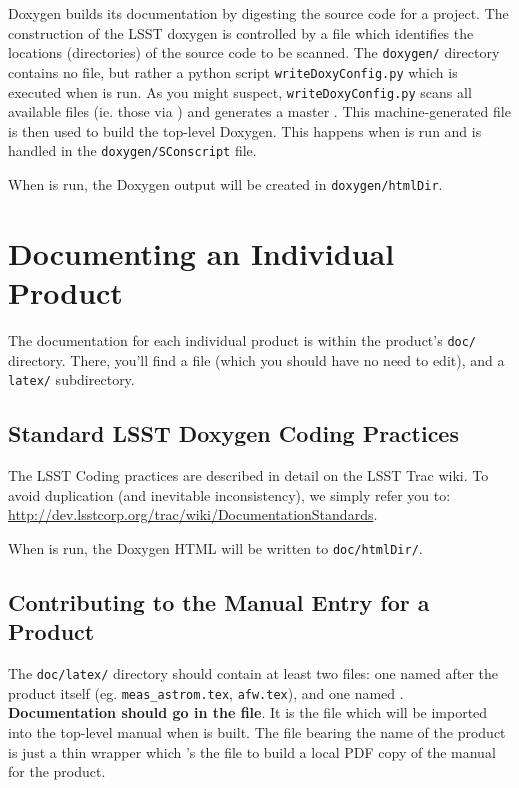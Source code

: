 Doxygen builds its documentation by digesting the source code for a
project.  The construction of the LSST doxygen is controlled by a
\ttdoxygenconf file which identifies the locations (directories) of the
source code to be scanned.  The \ttdevenvdoc \texttt{doxygen/}
directory contains no \ttdoxygenconf file, but rather a python script
\texttt{writeDoxyConfig.py} which is executed when \ttscons is run.
As you might suspect, \texttt{writeDoxyConfig.py} scans all available
\ttdoxygenconf files (ie. those \ttsetup via \tteups) and generates a
master \ttdoxygenconf.  This machine-generated file is then used to
build the top-level Doxygen.  This happens when \ttscons is run and is
handled in the \texttt{doxygen/SConscript} file.

When \ttscons is run, the Doxygen output will be created in
\texttt{doxygen/htmlDir}.
\fi

\section{Documenting an Individual Product\label{sec-productdoc}}

The documentation for each individual product is within the product's
\texttt{doc/} directory.  There, you'll find a \ttdoxygenconf file
(which you should have no need to edit), and a \texttt{latex/}
subdirectory.


\subsection{Standard LSST Doxygen Coding Practices\label{sec-doxypractices}}

The LSST Coding practices are described in detail on the LSST Trac
wiki.  To avoid duplication (and inevitable inconsistency), we simply
refer you to:
\url{http://dev.lsstcorp.org/trac/wiki/DocumentationStandards}.

When \ttscons is run, the Doxygen HTML will be written to \texttt{doc/htmlDir/}.


\subsection{Contributing to the Manual Entry for a Product\label{sec-productlatex}}

The \texttt{doc/latex/} directory should contain at least two \tttex
files: one named after the product itself
(eg. \texttt{meas\_astrom.tex}, \texttt{afw.tex}), and one named
\ttpackage.  {\bfseries Documentation should go in the \ttpackage
  file}.  It is the \ttpackage file which will be imported into the
top-level manual when \ttdevenvdoc is built.  The \tttex file bearing
the name of the product is just a thin wrapper which \ttinput's the
\ttpackage file to build a local PDF copy of the manual for the
product.

